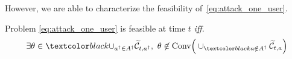 However, we are able to characterize the feasibility of~\eqref{eq:attack_one_user}.
%
\begin{thm}\label{thm:feasibility_attack_one_user}
        Problem \eqref{eq:attack_one_user} is feasible at time $t$ \emph{iff.} 
        \begin{equation}\label{eq:feasibilty_condition}
        \exists \theta \in \changelm{\cup_{a^\dagger\in A^{\dagger}}}\wt{\mathcal{C}}_{t, a^{\dagger}}, ~ \theta\not\in \text{Conv}\Big( \cup_{\changelm{a\notin A^{\dagger}}} \wt{\mathcal{C}}_{t,a}\Big)
        \end{equation}
\end{thm}

